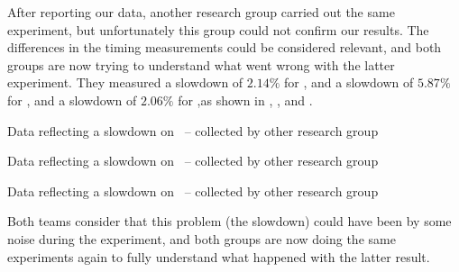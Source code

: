 After reporting our data, another research group carried out the same experiment, but unfortunately this group could not confirm our results. The differences in the timing measurements could be considered relevant, and both groups are now trying to understand what went wrong with the latter experiment. They measured a slowdown of $2.14 \%$ for \bzip, and a slowdown of $5.87 \%$ for \gzip, and a slowdown of $2.06 \%$ for \gcc,as shown in , , and .

\begin{table}
  \centering
  \begin{tiny}
  
  \end{tiny}
  \caption{Data reflecting a slowdown on \bzip\ -- collected by other research group}
  \label{tab:slowdownb}
\end{table}

\begin{table}
  \centering
  \begin{tiny}
  
  \end{tiny}
  \caption{Data reflecting a slowdown on \gzip\ -- collected by other research group}
  \label{tab:slowdownz}
\end{table}

\begin{table}
  \centering
  \begin{tiny}
  
  \end{tiny}
  \caption{Data reflecting a slowdown on \gcc\ -- collected by other research group}
  \label{tab:slowdowngcc}
\end{table}

Both teams consider that this problem (the slowdown) could have been by some noise during the experiment, and both groups are now doing the same experiments again to fully understand what happened with the latter result.
